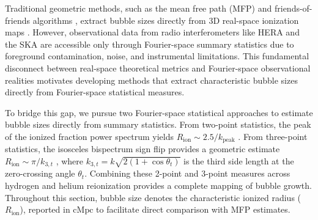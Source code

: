 \documentclass[apj,twocolumn, appendixfloats, twocolappendix, numberedappendix, tighten]{openjournal}
\begin{document}
Traditional geometric methods, such as the mean free path (MFP) \citep{Mesinger2007, Neyer2024} and friends-of-friends algorithms \citep{Iliev2006}, extract bubble sizes directly from 3D real-space ionization maps \citep[][]{Giri2018}. However, observational data from radio interferometers like HERA and the SKA are accessible only through Fourier-space summary statistics due to foreground contamination, noise, and instrumental limitations. This fundamental disconnect between real-space theoretical metrics and Fourier-space observational realities motivates developing methods that extract characteristic bubble sizes directly from Fourier-space statistical measures.




To bridge this gap, we pursue two Fourier-space statistical approaches to estimate bubble sizes directly from summary statistics. From two-point statistics, the peak of the ionized fraction power spectrum yields $R_\mathrm{ion} \sim 2.5/k_\mathrm{peak}$ \citep[e.g.,][]{Zaldarriaga2004, Furlanetto2004b}. From three-point statistics, the isosceles bispectrum sign flip provides a geometric estimate $R_\mathrm{ion} \sim \pi/k_{3,t}$ \citep[e.g.,][]{Majumdar2018, Hutter2020a}, where $k_{3,t} = k\sqrt{2(1+\cos\theta_t)}$ is the third side length at the zero-crossing angle $\theta_t$. Combining these 2-point and 3-point measures across hydrogen and helium reionization provides a complete mapping of bubble growth. Throughout this section, bubble size denotes the characteristic ionized radius ($R_\mathrm{ion}$), reported in $\mathrm{cMpc}$ to facilitate direct comparison with MFP estimates.
\end{document}
